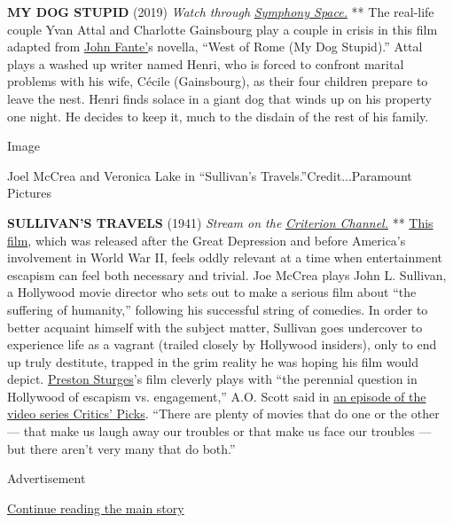 \textbf{MY DOG STUPID} (2019) \emph{Watch through}
\href{https://distribfilmsusvirtual.vhx.tv/products/my-dog-stupid-symphony-space}{\emph{Symphony
Space.}} ** The real-life couple Yvan Attal and Charlotte Gainsbourg
play a couple in crisis in this film adapted from
\href{https://www.nytimes.com/2002/02/28/books/books-of-the-times-a-truly-famous-unknown-writer.html?searchResultPosition=1}{John
Fante'}s novella, ``West of Rome (My Dog Stupid).'' Attal plays a washed
up writer named Henri, who is forced to confront marital problems with
his wife, Cécile (Gainsbourg), as their four children prepare to leave
the nest. Henri finds solace in a giant dog that winds up on his
property one night. He decides to keep it, much to the disdain of the
rest of his family.

Image

Joel McCrea and Veronica Lake in ``Sullivan's
Travels.''Credit...Paramount Pictures

\textbf{SULLIVAN'S TRAVELS} (1941) \emph{Stream on the}
\href{https://www.criterionchannel.com/}{\emph{Criterion Channel.}} **
\href{https://www.nytimes.com/1942/01/29/archives/comic-tour-in-sullivans-travels-on-the-paramounts-screen-a-yank-on.html}{This
film}, which was released after the Great Depression and before
America's involvement in World War II, feels oddly relevant at a time
when entertainment escapism can feel both necessary and trivial. Joe
McCrea plays John L. Sullivan, a Hollywood movie director who sets out
to make a serious film about ``the suffering of humanity,'' following
his successful string of comedies. In order to better acquaint himself
with the subject matter, Sullivan goes undercover to experience life as
a vagrant (trailed closely by Hollywood insiders), only to end up truly
destitute, trapped in the grim reality he was hoping his film would
depict.
\href{https://www.nytimes.com/2005/04/01/movies/sturgess-travels-a-screwball-tale.html}{Preston
Sturges}'s film cleverly plays with ``the perennial question in
Hollywood of escapism vs. engagement,'' A.O. Scott said in
\href{https://www.nytimes.com/video/arts/1194826561460/critics-picks-sullivan-s-travels.html}{an
episode of the video series Critics' Picks}. ``There are plenty of
movies that do one or the other --- that make us laugh away our troubles
or that make us face our troubles --- but there aren't very many that do
both.''

Advertisement

\protect\hyperlink{after-bottom}{Continue reading the main story}

